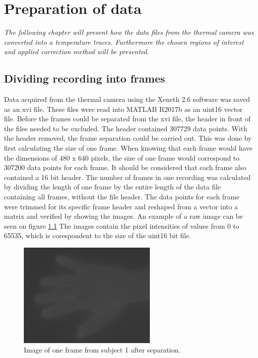 \chapter{Preparation of data}

\textit{The following chapter will present how the data files from the thermal camera was converted into a temperature traces. Furthermore the chosen regions of interest and applied correction method will be presented.}  

\section{Dividing recording into frames}

Data acquired from the thermal camera using the Xeneth 2.6 software was saved as an xvi file. These files were read into MATLAB R2017b as an uint16 vector file. Before the frames could be separated from the xvi file, the header in front of the files needed to be excluded. The header contained 307729 data points. With the header removed, the frame separation could be carried out. This was done by first calculating the size of one frame. When knowing that each frame would have the dimensions of 480 x 640 pixels, the size of one frame would correspond to 307200 data points for each frame. It should be considered that each frame also contained a 16 bit header. The number of frames in one recording was calculated by dividing the length of one frame by the entire length of the data file containing all frames, without the file header. The data points for each frame were trimmed for its specific frame header and reshaped from a vector into a matrix and verified by showing the images. An example of a raw image can be seen on figure \ref{fig:hand}
The images contain the pixel intensities of values from 0 to 65535, which is corespondent to the size of the uint16 bit file. 


\begin{figure}[H]
	\includegraphics[width=0.6\textwidth]{figures/uint16Hand}  %
	\caption{Image of one frame from subject 1 after separation.}
	\label{fig:hand}  %
\end{figure}